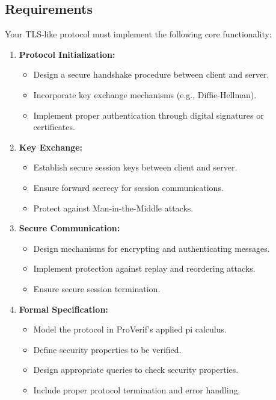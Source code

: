 \documentclass[10pt,a4paper,american]{exam}
\begin{document}
\subsection*{Requirements}
Your TLS-like protocol must implement the following core functionality:

\begin{enumerate}
	\item \textbf{Protocol Initialization:}
	      \begin{itemize}
		      \item Design a secure handshake procedure between client and server.
		      \item Incorporate key exchange mechanisms (e.g., Diffie-Hellman).
		      \item Implement proper authentication through digital signatures or certificates.
	      \end{itemize}

	\item \textbf{Key Exchange:}
	      \begin{itemize}
		      \item Establish secure session keys between client and server.
		      \item Ensure forward secrecy for session communications.
		      \item Protect against Man-in-the-Middle attacks.
	      \end{itemize}

	\item \textbf{Secure Communication:}
	      \begin{itemize}
		      \item Design mechanisms for encrypting and authenticating messages.
		      \item Implement protection against replay and reordering attacks.
		      \item Ensure secure session termination.
	      \end{itemize}

	\item \textbf{Formal Specification:}
	      \begin{itemize}
		      \item Model the protocol in ProVerif's applied pi calculus.
		      \item Define security properties to be verified.
		      \item Design appropriate queries to check security properties.
		      \item Include proper protocol termination and error handling.
	      \end{itemize}
\end{enumerate}
\end{document}
